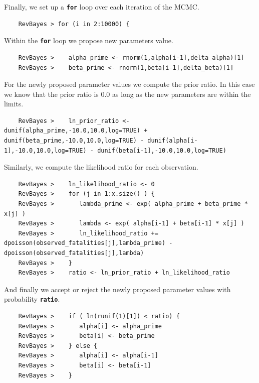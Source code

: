 \documentclass[11pt]{article}
\newcommand{\cl}[1]{{\texttt{\textbf{#1}}}}
\begin{document}
Finally, we set up a \cl{for} loop over each iteration of the MCMC.
{\tt \begin{snugshade*}
\begin{lstlisting}    
    RevBayes > for (i in 2:10000) {
\end{lstlisting}
\end{snugshade*}}
Within the \cl{for} loop we propose new parameters value.
{\tt \begin{snugshade*}
\begin{lstlisting}    
    RevBayes >    alpha_prime <- rnorm(1,alpha[i-1],delta_alpha)[1]
    RevBayes >    beta_prime <- rnorm(1,beta[i-1],delta_beta)[1]
\end{lstlisting}
\end{snugshade*}}
For the newly proposed parameter values we compute the prior ratio.
In this case we know that the prior ratio is 0.0 as long as the new parameters are within the limits.
{\tt \begin{snugshade*}
\begin{lstlisting}    
    RevBayes >    ln_prior_ratio <- dunif(alpha_prime,-10.0,10.0,log=TRUE) + dunif(beta_prime,-10.0,10.0,log=TRUE) - dunif(alpha[i-1],-10.0,10.0,log=TRUE) - dunif(beta[i-1],-10.0,10.0,log=TRUE)
\end{lstlisting}
\end{snugshade*}}
Similarly, we compute the likelihood ratio for each observation.
{\tt \begin{snugshade*}
\begin{lstlisting}    
    RevBayes >    ln_likelihood_ratio <- 0
    RevBayes >    for (j in 1:x.size() ) {
    RevBayes >       lambda_prime <- exp( alpha_prime + beta_prime * x[j] )
    RevBayes >       lambda <- exp( alpha[i-1] + beta[i-1] * x[j] )
    RevBayes >       ln_likelihood_ratio += dpoisson(observed_fatalities[j],lambda_prime) - dpoisson(observed_fatalities[j],lambda)
    RevBayes >    }
    RevBayes >    ratio <- ln_prior_ratio + ln_likelihood_ratio
\end{lstlisting}
\end{snugshade*}}
And finally we accept or reject the newly proposed parameter values with probability \cl{ratio}.
{\tt \begin{snugshade*}
\begin{lstlisting}    
    RevBayes >    if ( ln(runif(1)[1]) < ratio) {
    RevBayes >       alpha[i] <- alpha_prime
    RevBayes >       beta[i] <- beta_prime
    RevBayes >    } else {
    RevBayes >       alpha[i] <- alpha[i-1]
    RevBayes >       beta[i] <- beta[i-1]
    RevBayes >    }
\end{lstlisting}
\end{snugshade*}}
\end{document}
